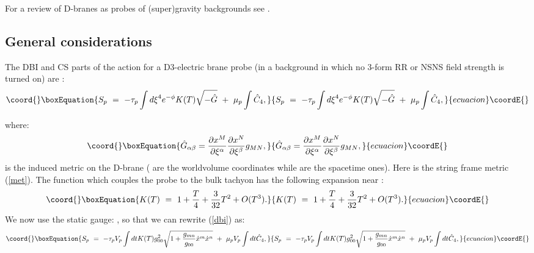 \documentclass[a4paper,12pt]{article}
\begin{document}
For a review of D-branes as probes of (super)gravity backgrounds see \cite{j}.

\subsection{General considerations}
 The DBI and CS parts of the action for a D3-electric brane probe (in a background in which no 3-form RR or NSNS field strength is turned on) are \cite{garousi}:
\begin{equation}\coord{}\boxEquation{
{S_p}~=~-{\tau_p}\int {{d\xi}^4}{e^{-\phi}}K(T)\sqrt{-\hat{G}}~+~{{\mu}_p}\int {\hat C}_4 ,
\label{dbi}
}{
{S_p}~=~-{\tau_p}\int {{d\xi}^4}{e^{-\phi}}K(T)\sqrt{-\hat{G}}~+~{{\mu}_p}\int {\hat C}_4 ,
}{ecuacion}\coordE{}\end{equation}

\noindent where:
\begin{equation}\coord{}\boxEquation{
{\hat G}_{\alpha\beta}= {{\partial x^M}
\over{\partial \xi ^\alpha}}{{\partial x^N}\over{ \partial \xi ^\beta}}g_{MN},
}{
{\hat G}_{\alpha\beta}= {{\partial x^M}
\over{\partial \xi ^\alpha}}{{\partial x^N}\over{ \partial \xi ^\beta}}g_{MN},
}{ecuacion}\coordE{}\end{equation}
\noindent is the induced metric on the D-brane (\coordHE{} are the worldvolume coordinates while \coordHE{} are the spacetime ones). Here \coordHE{} is the string frame metric (\ref{met}).
The function \coordHE{} which couples the probe to the bulk tachyon has the following
expansion near \coordHE{} \cite{garousi}:
\begin{equation}\coord{}\boxEquation{
K(T)~=~1+ {T\over4} + {3\over{32}}T^2 + O(T^3).
\label{k(t)}
}{
K(T)~=~1+ {T\over4} + {3\over{32}}T^2 + O(T^3).
}{ecuacion}\coordE{}\end{equation}
\noindent We now use the static gauge: \coordHE{}, so that we can rewrite (\ref{dbi}) as:
\begin{equation}\coord{}\boxEquation{
{S_p}~=~-{\tau_p}{V_p}\int dt K(T)g^2_{00} \sqrt{ 1+ {g_{mn}\over{g_{00}}}{\dot x}^m{\dot x}^n }~+~ {{\mu}_p}{V_p} \int dt {\hat C}_4,
\label{probact}
}{
{S_p}~=~-{\tau_p}{V_p}\int dt K(T)g^2_{00} \sqrt{ 1+ {g_{mn}\over{g_{00}}}{\dot x}^m{\dot x}^n }~+~ {{\mu}_p}{V_p} \int dt {\hat C}_4,
}{ecuacion}\coordE{}\end{equation}
\end{document}
